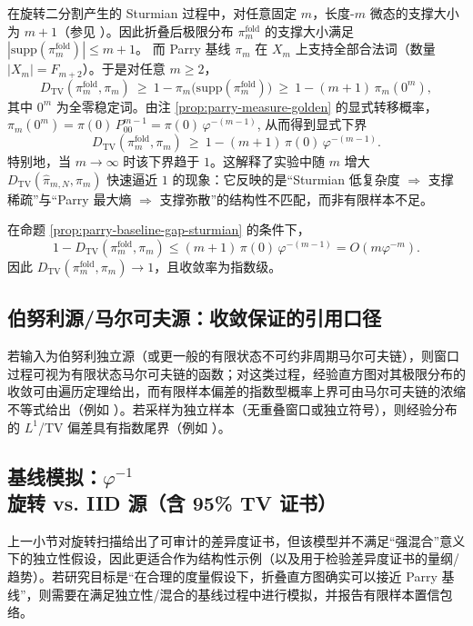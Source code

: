 \begin{proposition}\label{prop:parry-baseline-gap-sturmian}
在旋转二分割产生的 Sturmian 过程中，对任意固定 $m$，长度-$m$ 微态的支撑大小为 $m+1$（参见 \cite{MorseHedlund1940,LindMarcus1995}）。因此折叠后极限分布 $\pi_m^{\mathrm{fold}}$ 的支撑大小满足
\(
|\mathrm{supp}(\pi_m^{\mathrm{fold}})|\le m+1
\)。
而 Parry 基线 $\pi_m$ 在 $X_m$ 上支持全部合法词（数量 $|X_m|=F_{m+2}$）。于是对任意 $m\ge 2$，
\[
D_{\mathrm{TV}}(\pi_m^{\mathrm{fold}},\pi_m)\ \ge\ 1-\pi_m\bigl(\mathrm{supp}(\pi_m^{\mathrm{fold}})\bigr)
\ \ge\ 1-(m+1)\,\pi_m(0^m),
\]
其中 $0^m$ 为全零稳定词。由注 \ref{prop:parry-measure-golden} 的显式转移概率，
\(
\pi_m(0^m)=\pi(0)\,P_{00}^{m-1}=\pi(0)\,\varphi^{-(m-1)}
\),
从而得到显式下界
\[
D_{\mathrm{TV}}(\pi_m^{\mathrm{fold}},\pi_m)\ \ge\ 1-(m+1)\,\pi(0)\,\varphi^{-(m-1)}.
\]
特别地，当 $m\to\infty$ 时该下界趋于 $1$。这解释了实验中随 $m$ 增大 $D_{\mathrm{TV}}(\hat{\pi}_{m,N},\pi_m)$ 快速逼近 $1$ 的现象：它反映的是“Sturmian 低复杂度 $\Rightarrow$ 支撑稀疏”与“Parry 最大熵 $\Rightarrow$ 支撑弥散”的结构性不匹配，而非有限样本不足。
\end{proposition}

\begin{corollary}\label{cor:parry-gap-exp}
在命题 \ref{prop:parry-baseline-gap-sturmian} 的条件下，
\[
1-D_{\mathrm{TV}}(\pi_m^{\mathrm{fold}},\pi_m)
\le (m+1)\,\pi(0)\,\varphi^{-(m-1)}
=O(m\varphi^{-m}).
\]
因此 $D_{\mathrm{TV}}(\pi_m^{\mathrm{fold}},\pi_m)\to 1$，且收敛率为指数级。
\end{corollary}

\subsection{伯努利源/马尔可夫源：收敛保证的引用口径}

\begin{remark}[伯努利源的极限与有限样本界的引用口径]\label{rem:bernoulli-source-guarantee}
若输入为伯努利独立源（或更一般的有限状态不可约非周期马尔可夫链），则窗口过程可视为有限状态马尔可夫链的函数；对这类过程，经验直方图对其极限分布的收敛可由遍历定理给出，而有限样本偏差的指数型概率上界可由马尔可夫链的浓缩不等式给出（例如 \cite{Paulin2015MarkovConcentration}）。若采样为独立样本（无重叠窗口或独立符号），则经验分布的 $L^1$/TV 偏差具有指数尾界（例如 \cite{WeissmanEtAl2003L1Empirical}）。
\end{remark}

\subsection{基线模拟：\texorpdfstring{$\varphi^{-1}$}{phi} 旋转 vs. IID 源（含 95\% TV 证书）}\label{subsec:exp-iid-baselines}
上一小节对旋转扫描给出了可审计的差异度证书，但该模型并不满足“强混合”意义下的独立性假设，因此更适合作为结构性示例（以及用于检验差异度证书的量纲/趋势）。若研究目标是“在合理的度量假设下，折叠直方图确实可以接近 Parry 基线”，则需要在满足独立性/混合的基线过程中进行模拟，并报告有限样本置信包络。

